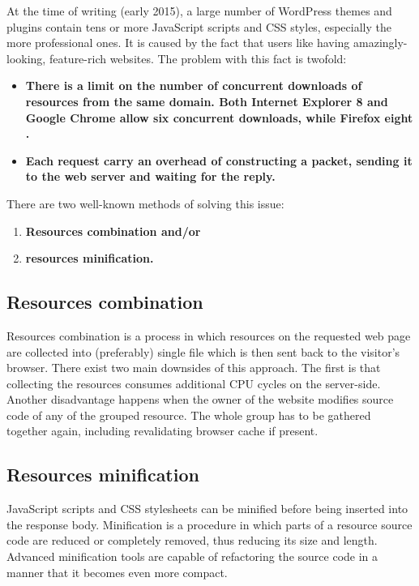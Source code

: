 At the time of writing (early 2015), a large number of WordPress themes and plugins contain tens or more JavaScript scripts and CSS styles, especially the more professional ones. It is caused by the fact that users like having amazingly-looking, feature-rich websites. The problem with this fact is twofold:
 
\begin{itemize}
	\item \textbf{There is a limit on the number of concurrent downloads of resources from the same domain. Both Internet Explorer 8 and Google Chrome allow six concurrent downloads, while Firefox eight \cite{Study:Browser-concurrent-downloads}.}
	\item \textbf{Each request carry an overhead of constructing a packet, sending it to the web server and waiting for the reply.}
\end{itemize}

There are two well-known methods of solving this issue:

\begin{enumerate}
    \item\textbf{Resources combination and/or}
    \item\textbf{resources minification.}
  \end{enumerate}

\subsection*{Resources combination}

Resources combination is a process in which resources on the requested web page are collected into (preferably) single file which is then sent back to the visitor’s browser. There exist two main downsides of this approach. The first is that collecting the resources consumes additional CPU cycles on the server-side. Another disadvantage happens when the owner of the website modifies source code of any of the grouped resource. The whole group has to be gathered together again, including revalidating browser cache if present.

\subsection*{Resources minification}

JavaScript scripts and CSS stylesheets can be minified before being inserted into the response body. Minification is a procedure in which parts of a resource source code are reduced or completely removed, thus reducing its size and length. Advanced minification tools are capable of refactoring the source code in a manner that it becomes even more compact.

